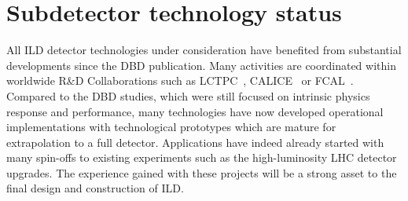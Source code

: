 \newpage
\section{Subdetector technology status}


All ILD detector technologies under consideration have benefited from substantial developments since the DBD publication. Many activities are coordinated within worldwide R\&D Collaborations such as LCTPC~\cite{ild:bib:TPC_lctpc}, CALICE~\cite{ild:bib:CALICE} or FCAL~\cite{ild:bib:FCAL}. Compared to the DBD studies, which were still focused on intrinsic physics response and performance, many technologies have now developed operational implementations with technological prototypes which are mature for extrapolation to a full detector. Applications have indeed already started with many spin-offs to existing experiments such as the high-luminosity LHC detector upgrades. The experience gained with these projects will be a strong asset to the final design and construction of ILD.  








